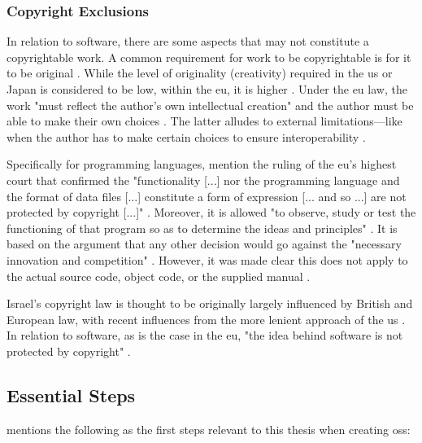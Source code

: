 \subsubsection{Copyright Exclusions}

In relation to software, there are some aspects that may not constitute a copyrightable work.
A common requirement for work to be copyrightable is for it to be original \parencite{Fisher_2016}.
While the level of originality (creativity) required in the \gls{us} or Japan is considered to be low, within the \gls{eu}, it is higher \parencite{Fisher_2016}.
Under the \gls{eu} law, the work "must reflect the author's own intellectual creation" and the author must be able to make their own choices \parencite[p. 443]{Fisher_2016}.
The latter alludes to external limitations---like when the author has to make certain choices to ensure interoperability \parencite{Fisher_2016}.

Specifically for programming languages, \textcite{Rose_2012} mention the ruling of the \gls{eu}'s highest court that confirmed the "functionality [...] nor the programming language and the format of data files [...] constitute a form of expression [... and so ...] are not protected by copyright [...]" \parencite{cjeu_2012}.
Moreover, it is allowed "to observe, study or test the functioning of that program so as to determine the ideas and principles" \parencite{cjeu_2012}.
It is based on the argument that any other decision would go against the "necessary innovation and competition" \parencite{Rose_2012}.
However, it was made clear this does not apply to the actual source code, object code, or the supplied manual \parencite{Rose_2012}.

Israel's copyright law is thought to be originally largely influenced by British and European law, with recent influences from the more lenient approach of the \gls{us} \parencite{Greenman_2012}.
In relation to software, as is the case in the \gls{eu}, "the idea behind software is not protected by copyright" \parencite{suslina_approaches_2018}.

\subsection{Essential Steps}
\label{sec:oss-essential-steps}

\textcite[Chapter~2]{Fogel_2022} mentions the following as the first steps relevant to this thesis when creating \gls{oss}:

